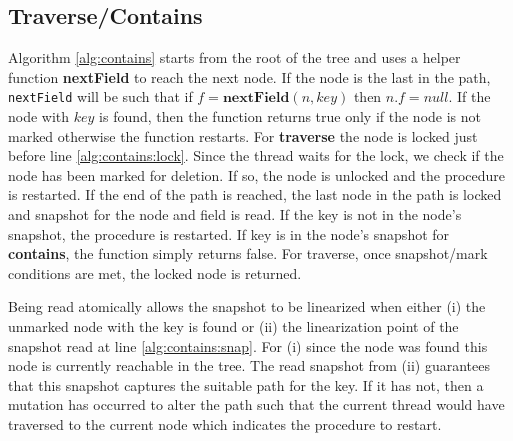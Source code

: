 \documentclass[conference]{IEEEtran}
\theoremstyle{definition}
\theoremstyle{theorem}
\begin{document}
\subsection{Traverse/Contains}
Algorithm \ref{alg:contains} starts from the root of the tree and uses a helper function \textbf{nextField} to reach the next node. If the node is the last in the path, \texttt{nextField} will be such that if $f=\mathbf{nextField}(n, key)$ then $n.f = null$. If the node with $key$ is found, then the function returns true only if the node is not marked otherwise the function restarts. For \textbf{traverse} the node is locked just before line \ref{alg:contains:lock}. Since the thread waits for the lock, we check if the node has been marked for deletion. If so, the node is unlocked and the procedure is restarted. If the end of the path is reached, the last node in the path is locked and snapshot for the node and field is read. If the key is not in the node's snapshot, the procedure is restarted. If key is in the node's snapshot for \textbf{contains}, the function simply returns false. For traverse, once snapshot/mark conditions are met, the locked node is returned.

Being read atomically allows the snapshot to be linearized when either (i) the unmarked node with the key is found or (ii) the linearization point of the snapshot read at line \ref{alg:contains:snap}. For (i) since the node was found this node is currently reachable in the tree. The read snapshot from (ii) guarantees  that this snapshot captures the suitable path for the key. If it has not, then a mutation has occurred to alter the path such that the current thread would have traversed to the current node which indicates the procedure to restart.
\end{document}
